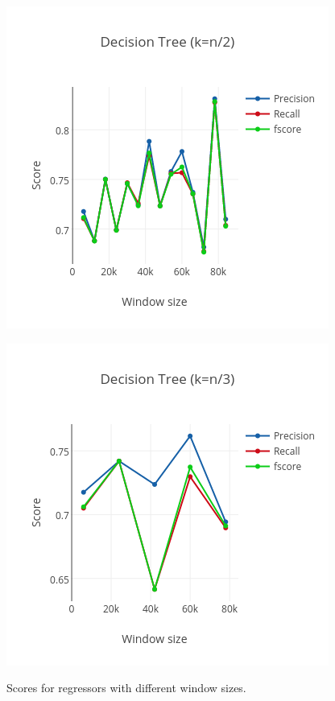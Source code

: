 \documentclass[letterpaper,11pt]{article}
\begin{document}
\begin{figure}
\begin{minipage}{.45\linewidth}
  \label{fig:svm3}
\end{minipage}
\begin{minipage}{.45\linewidth}
  \includegraphics[width=\linewidth]{../data_mapred/img/truncated/tree2.png}
  \label{fig:tree2}
\end{minipage}
\begin{minipage}{.45\linewidth}
  \includegraphics[width=\linewidth]{../data_mapred/img/truncated/tree3.png}
  \label{fig:tree3}
\end{minipage}
\caption{Scores for regressors with different window sizes.}
\label{fig:adr}
\end{figure}
\end{document}
